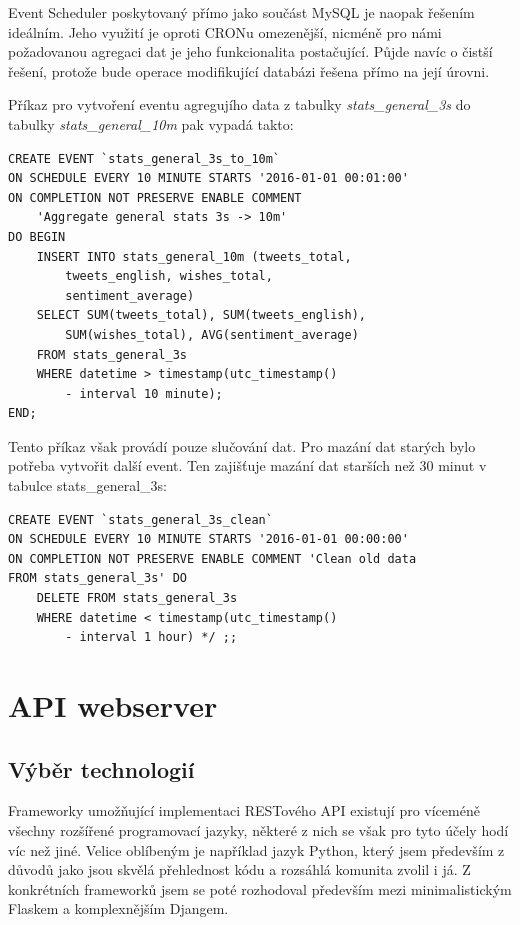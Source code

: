 \documentclass[thesis=B,czech]{FITthesis}[2012/06/26]
\begin{document}
	Event Scheduler poskytovaný přímo jako součást MySQL je naopak řešením ideálním. Jeho využití je oproti CRONu omezenější, nicméně pro námi požadovanou agregaci dat je jeho funkcionalita postačující. Půjde navíc o čistší řešení, protože bude operace modifikující databázi řešena přímo na její úrovni. 
	
	Příkaz pro vytvoření eventu agregujího data z tabulky \textit{stats\_general\_3s} do tabulky \textit{stats\_general\_10m }pak vypadá takto:
	
\begin{lstlisting}
CREATE EVENT `stats_general_3s_to_10m` 
ON SCHEDULE EVERY 10 MINUTE STARTS '2016-01-01 00:01:00' 
ON COMPLETION NOT PRESERVE ENABLE COMMENT 
	'Aggregate general stats 3s -> 10m' 
DO BEGIN 
	INSERT INTO stats_general_10m (tweets_total, 
		tweets_english, wishes_total, 
		sentiment_average) 
	SELECT SUM(tweets_total), SUM(tweets_english), 
		SUM(wishes_total), AVG(sentiment_average) 
	FROM stats_general_3s 
	WHERE datetime > timestamp(utc_timestamp() 
		- interval 10 minute); 
END;
\end{lstlisting}

Tento příkaz však provádí pouze slučování dat. Pro mazání dat starých bylo potřeba vytvořit další event. Ten zajišťuje mazání dat starších než 30 minut v tabulce stats\_general\_3s:

\begin{lstlisting}
CREATE EVENT `stats_general_3s_clean` 
ON SCHEDULE EVERY 10 MINUTE STARTS '2016-01-01 00:00:00' 
ON COMPLETION NOT PRESERVE ENABLE COMMENT 'Clean old data 
FROM stats_general_3s' DO 
	DELETE FROM stats_general_3s
	WHERE datetime < timestamp(utc_timestamp() 
		- interval 1 hour) */ ;;
\end{lstlisting}

\section{API webserver}
\subsection{Výběr technologií}
	Frameworky umožňující implementaci RESTového API existují pro víceméně všechny rozšířené programovací jazyky, některé z nich se však pro tyto účely hodí víc než jiné. Velice oblíbeným je například jazyk Python, který jsem především z důvodů jako jsou skvělá přehlednost kódu a rozsáhlá komunita zvolil i já. Z konkrétních frameworků jsem se poté rozhodoval především mezi minimalistickým Flaskem a komplexnějším Djangem. 
	
\end{document}
